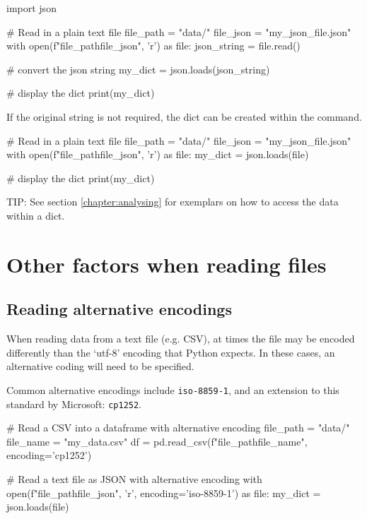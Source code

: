 \begin{pycode}
    import json

    # Read in a plain text file
    file_path = "data/"
    file_json = "my_json_file.json"
    with open(f"{file_path}{file_json}", 'r') as file:
        json_string = file.read()

    # convert the json string
    my_dict = json.loads(json_string)

    # display the dict
    print(my_dict)
\end{pycode}

If the original string is not required, the dict can be created within the  command.

\begin{pycode}
    # Read in a plain text file
    file_path = "data/"
    file_json = "my_json_file.json"
    with open(f"{file_path}{file_json}", 'r') as file:
        my_dict = json.loads(file)

    # display the dict
    print(my_dict)
\end{pycode}

TIP: See section \ref{chapter:analysing} for exemplars on how to access the data within a dict.

\section{Other factors when reading files}

\subsection{Reading alternative encodings}

When reading data from a text file (e.g. CSV), at times the file may be encoded differently than the `utf-8' encoding that Python expects. In these cases, an alternative coding will need to be specified.

Common alternative encodings include \texttt{iso-8859-1}, and an extension to this standard by Microsoft: \texttt{cp1252}.

\begin{pycode}
    # Read a CSV into a dataframe with alternative encoding
    file_path = "data/"
    file_name = "my_data.csv"
    df = pd.read_csv(f"{file_path}{file_name}", encoding='cp1252')

    # Read a text file as JSON with alternative encoding
    with open(f"{file_path}{file_json}", 'r', encoding='iso-8859-1') as file:
        my_dict = json.loads(file)


\end{pycode}

